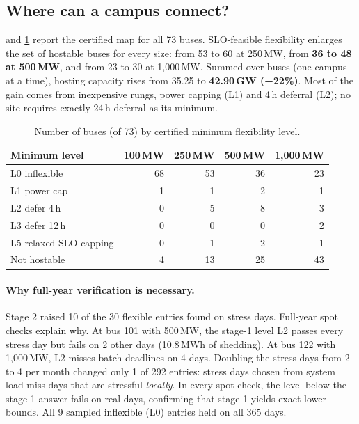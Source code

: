 \documentclass{article} %
\begin{document}
\subsection{Where can a campus connect?}
\label{sec:exp_map}
 and \cref{tab:map} report the certified map for all 73 buses. SLO-feasible flexibility enlarges the set of hostable buses for every size: from 53 to 60 at 250\,MW, from \textbf{36 to 48 at 500\,MW}, and from 23 to 30 at 1{,}000\,MW. Summed over buses (one campus at a time), hosting capacity rises from 35.25 to \textbf{42.90\,GW (+22\%)}. Most of the gain comes from inexpensive rungs, power capping (L1) and 4\,h deferral (L2); no site requires exactly 24\,h deferral as its minimum.


\begin{table}[t]
    \centering
    \caption{Number of buses (of 73) by certified minimum flexibility level.}
    \label{tab:map}
    \small
    \begin{tabular}{lrrrr}
        \toprule
        Minimum level & 100\,MW & 250\,MW & 500\,MW & 1{,}000\,MW \\
        \midrule
        L0 inflexible & 68 & 53 & 36 & 23 \\
        L1 power cap & 1 & 1 & 2 & 1 \\
        L2 defer 4\,h & 0 & 5 & 8 & 3 \\
        L3 defer 12\,h & 0 & 0 & 0 & 2 \\
        L5 relaxed-SLO capping & 0 & 1 & 2 & 1 \\
        Not hostable & 4 & 13 & 25 & 43 \\
        \bottomrule
    \end{tabular}
\end{table}

\paragraph{Why full-year verification is necessary.} Stage 2 raised 10 of the 30 flexible entries found on stress days. Full-year spot checks explain why. At bus 101 with 500\,MW, the stage-1 level L2 passes every stress day but fails on 2 other days (10.8\,MWh of shedding). At bus 122 with 1{,}000\,MW, L2 misses batch deadlines on 4 days. Doubling the stress days from 2 to 4 per month changed only 1 of 292 entries: stress days chosen from system load miss days that are stressful \emph{locally}. In every spot check, the level below the stage-1 answer fails on real days, confirming that stage 1 yields exact lower bounds. All 9 sampled inflexible (L0) entries held on all 365 days.
\end{document}
